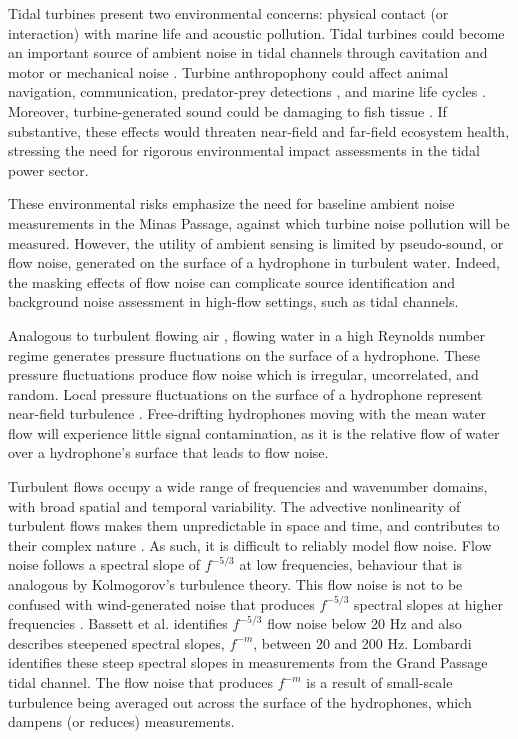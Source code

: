 \documentclass[12pt,journal,onecolumn]{IEEEtran}
\begin{document}
Tidal turbines present two environmental concerns: physical contact (or interaction) with marine life \cite{dadswell} \cite{redden} and acoustic pollution. Tidal turbines could become an important source of ambient noise in tidal channels through cavitation and motor or mechanical noise \cite{wang}. %
Turbine anthropophony could affect animal navigation, communication, predator-prey detections \cite{lombardi}, and marine life cycles \cite{pine}. Moreover, turbine-generated sound could be damaging to fish tissue \cite{halvorsen}. If substantive, these effects would threaten near-field and far-field ecosystem health, stressing the need for rigorous environmental impact assessments in the tidal power sector. 

These environmental risks emphasize the need for baseline ambient noise measurements in the Minas Passage, against which turbine noise pollution will be measured. However, the utility of ambient sensing is limited by pseudo-sound, or flow noise, generated on the surface of a hydrophone in turbulent water. Indeed, the masking effects of flow noise can complicate source identification and background noise assessment in high-flow settings, such as tidal channels.

Analogous to turbulent flowing air \cite{light}, flowing water in a high Reynolds number regime generates pressure fluctuations on the surface of a hydrophone. These pressure fluctuations produce flow noise which is irregular, uncorrelated, and random. Local pressure fluctuations on the surface of a hydrophone represent near-field turbulence \cite{strasberg}. Free-drifting hydrophones moving with the mean water flow will experience little signal contamination, as it is the relative flow of water over a hydrophone's surface that leads to flow noise.  

Turbulent flows occupy a wide range of frequencies and wavenumber domains, with broad spatial and temporal variability. The advective nonlinearity %
of turbulent flows makes them unpredictable in space and time, and contributes to their complex nature \cite{van}. As such, it is difficult to reliably model flow noise. Flow noise follows a spectral slope of $f^{-5/3}$ at low frequencies, behaviour that is analogous by Kolmogorov's turbulence theory. This flow noise is not to be confused with wind-generated noise that produces $f^{-5/3}$ spectral slopes at higher frequencies \cite{knud}. Bassett et al. \cite{bassett} identifies $f^{-5/3}$ flow noise below 20 Hz and also describes steepened spectral slopes, $f^{-m}$, between 20 and 200 Hz. Lombardi \cite{lombardi} identifies these steep spectral slopes in measurements from the Grand Passage tidal channel. The flow noise that produces $f^{-m}$ is a result of small-scale turbulence being averaged out across the surface of the hydrophones, which dampens (or reduces) measurements.
\end{document}
